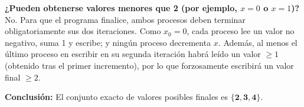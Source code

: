 \begin{solucion}
\textbf{¿Pueden obtenerse valores menores que 2 (por ejemplo, $x = 0$ o $x = 1$)?}
No. Para que el programa finalice, ambos procesos deben terminar obligatoriamente sus dos iteraciones. Como $x_0 = 0$, cada proceso lee un valor no negativo, suma 1 y escribe; y ningún proceso decrementa $x$. Además, al menos el último proceso en escribir en su segunda iteración habrá leído un valor $\ge 1$ (obtenido tras el primer incremento), por lo que forzosamente escribirá un valor final $\ge 2$.

\textbf{Conclusión:} El conjunto exacto de valores posibles finales es $\mathbf{\{2, 3, 4\}}$.
\end{solucion}

